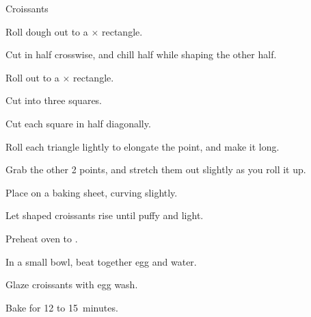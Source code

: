 \begin{recipe}{Croissants}{}{}
\begin{directions}
\item Roll dough out to a $\times$ rectangle.
\item Cut in half crosswise, and chill half while shaping the other half.
\item Roll out to a $\times$ rectangle.
\item Cut into three  squares.
\item Cut each square in half diagonally.
\item Roll each triangle lightly to elongate the point, and make it  long.
\item Grab the other 2 points, and stretch them out slightly as you roll it up.
\item Place on a baking sheet, curving slightly.
\item Let shaped croissants rise until puffy and light.
\item Preheat oven to .
\item In a small bowl, beat together egg and  water.
\item Glaze croissants with egg wash.
\item Bake for 12 to 15~minutes.
\end{directions}
\end{recipe}
